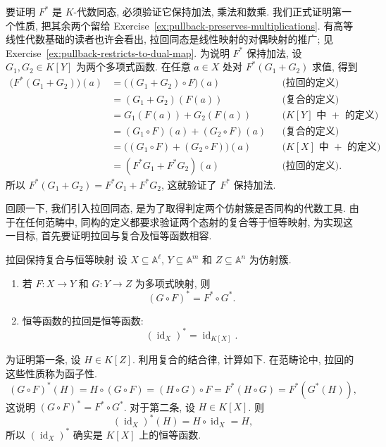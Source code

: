 \begin{Proof}
\BookPairedNote
  {要证明 $F^{*}$ 是 $K$-代数同态, 必须验证它保持加法, 乘法和数乘. 我们正式证明第一个性质, 把其余两个留给 Exercise~\ref{ex:pullback-preserves-multiplications}.}
  {有高等线性代数基础的读者也许会看出, 拉回同态是线性映射的对偶映射的推广; 见 Exercise~\ref{ex:pullback-restricts-to-dual-map}.}
\noindent 为说明 $F^{*}$ 保持加法, 设 $G_{1},G_{2}\in K[Y]$ 为两个多项式函数. 在任意 $a\in X$ 处对 $F^{*}(G_{1}+G_{2})$ 求值, 得到
\[
  \begin{aligned}
    \bigl(F^{*}(G_{1}+G_{2})\bigr)(a)&=\bigl((G_{1}+G_{2})\circ F\bigr)(a)
       &&\text{(拉回的定义)}\\
    &=(G_{1}+G_{2})(F(a)) &&\text{(复合的定义)}\\
    &=G_{1}(F(a))+G_{2}(F(a)) &&\text{($K[Y]$ 中 $+$ 的定义)}\\
    &=(G_{1}\circ F)(a)+(G_{2}\circ F)(a) &&\text{(复合的定义)}\\
    &=\bigl((G_{1}\circ F)+(G_{2}\circ F)\bigr)(a) &&\text{($K[X]$ 中 $+$ 的定义)}\\
    &=(F^{*}G_{1}+F^{*}G_{2})(a) &&\text{(拉回的定义)}.
  \end{aligned}
\]
所以 $F^{*}(G_{1}+G_{2})=F^{*}G_{1}+F^{*}G_{2}$, 这就验证了 $F^{*}$ 保持加法.
\end{Proof}

回顾一下, 我们引入拉回同态, 是为了取得判定两个仿射簇是否同构的代数工具. 由于在任何范畴中, \textquotedbl{}同构\textquotedbl{}的定义都要求验证两个态射的复合等于恒等映射, 为实现这一目标, 首先要证明拉回与复合及恒等函数相容.

\begin{Proposition}{拉回保持复合与恒等映射}\leavevmode\label{prop:pullback-preserves-compositions-and-identity}
  设 $X\subseteq\mathbb{A}^{\ell}$, $Y\subseteq\mathbb{A}^{m}$ 和 $Z\subseteq\mathbb{A}^{n}$ 为仿射簇.
  \begin{enumerate}
    \item 若 $F:X\to Y$ 和 $G:Y\to Z$ 为多项式映射, 则
      \[
        (G\circ F)^{*}=F^{*}\circ G^{*}.
      \]
    \item 恒等函数的拉回是恒等函数:
      \[
        (\operatorname{id}_{X})^{*}=\operatorname{id}_{K[X]}.
      \]
  \end{enumerate}
\end{Proposition}

\begin{Proof}
\BookPairedNote
  {为证明第一条, 设 $H\in K[Z]$. 利用复合的结合律, 计算如下.}
  {在范畴论中, 拉回的这些性质称为\textquotedbl{}函子性\textquotedbl{}.}
\[
  (G\circ F)^{*}(H)=H\circ(G\circ F)=(H\circ G)\circ F
    =F^{*}(H\circ G)=F^{*}(G^{*}(H)),
\]
这说明 $(G\circ F)^{*}=F^{*}\circ G^{*}$. 对于第二条, 设 $H\in K[X]$. 则
\[
  (\operatorname{id}_{X})^{*}(H)=H\circ\operatorname{id}_{X}=H,
\]
所以 $(\operatorname{id}_{X})^{*}$ 确实是 $K[X]$ 上的恒等函数.
\end{Proof}

